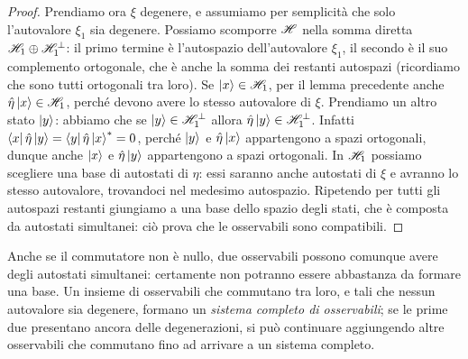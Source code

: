 \begin{proof}
	Prendiamo ora $\xi$ degenere, e assumiamo per semplicità che solo l'autovalore $\xi_1$ sia degenere.
	Possiamo scomporre $\mathscr H$ nella somma diretta $\mathscr H_1\oplus\mathscr H^\perp_1$: il primo termine è l'autospazio dell'autovalore $\xi_1$, il secondo è il suo complemento ortogonale, che è anche la somma dei restanti autospazi (ricordiamo che sono tutti ortogonali tra loro).
	Se $\left|{x}\right\rangle\in\mathscr H_1$, per il lemma precedente anche $\hat{\eta}\left|{x}\right\rangle\in\mathscr H_1$, perch\'e devono avere lo stesso autovalore di $\xi$.
	Prendiamo un altro stato $\left|{y}\right\rangle$: abbiamo che se $\left|{y}\right\rangle\in\mathscr H_1^\perp$ allora $\hat{\eta}\left|{y}\right\rangle\in\mathscr H_1^\perp$.
	Infatti $\left\langle{x}\right|\hat{\eta}\left|{y}\right\rangle=\left\langle{y}\right|\hat{\eta}\left|{x}\right\rangle^*=0$, perch\'e $\left|{y}\right\rangle$ e $\hat{\eta}\left|{x}\right\rangle$ appartengono a spazi ortogonali, dunque anche $\left|{x}\right\rangle$ e $\hat{\eta}\left|{y}\right\rangle$ appartengono a spazi ortogonali.
	In $\mathscr H_1$ possiamo scegliere una base di autostati di $\eta$: essi saranno anche autostati di $\xi$ e avranno lo stesso autovalore, trovandoci nel medesimo autospazio.
	Ripetendo per tutti gli autospazi restanti giungiamo a una base dello spazio degli stati, che è composta da autostati simultanei: ciò prova che le osservabili sono compatibili.
\end{proof}
Anche se il commutatore non è nullo, due osservabili possono comunque avere degli autostati simultanei: certamente non potranno essere abbastanza da formare una base.
Un insieme di osservabili che commutano tra loro, e tali che nessun autovalore sia degenere, formano un \emph{sistema completo di osservabili}; se le prime due presentano ancora delle degenerazioni, si può continuare aggiungendo altre osservabili che commutano fino ad arrivare a un sistema completo.

